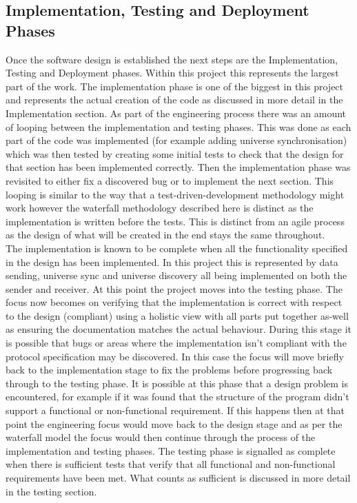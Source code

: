 \documentclass[11pt,a4paper]{article}
\begin{document}
\subsection{Implementation, Testing and Deployment Phases}
Once the software design is established the next steps are the Implementation, Testing and Deployment phases. Within this project this represents the largest part of the work. The implementation phase is one of the biggest in this project and represents the actual creation of the code as discussed in more detail in the Implementation section. As part of the engineering process there was an amount of looping between the implementation and testing phases. This was done as each part of the code was implemented (for example adding universe synchronisation) which was then tested by creating some initial tests to check that the design for that section has been implemented correctly. Then the implementation phase was revisited to either fix a discovered bug or to implement the next section. This looping is similar to the way that a test-driven-development methodology might work however the waterfall methodology described here is distinct as the implementation is written before the tests. This is distinct from an agile process as the design of what will be created in the end stays the same throughout.\\

The implementation is known to be complete when all the functionality specified in the design has been implemented. In this project this is represented by data sending, universe sync and universe discovery all being implemented on both the sender and receiver. At this point the project moves into the testing phase. The focus now becomes on verifying that the implementation is correct with respect to the design (compliant) using a holistic view with all parts put together as-well as ensuring the documentation matches the actual behaviour. During this stage it is possible that bugs or areas where the implementation isn't compliant with the protocol specification may be discovered. In this case the focus will move briefly back to the implementation stage to fix the problems before progressing back through to the testing phase. It is possible at this phase that a design problem is encountered, for example if it was found that the structure of the program didn't support a functional or non-functional requirement. If this happens then at that point the engineering focus would move back to the design stage and as per the waterfall model the focus would then continue through the process of the implementation and testing phases. The testing phase is signalled as complete when there is sufficient tests that verify that all functional and non-functional requirements have been met. What counts as sufficient is discussed in more detail in the testing section.\\
\end{document}
